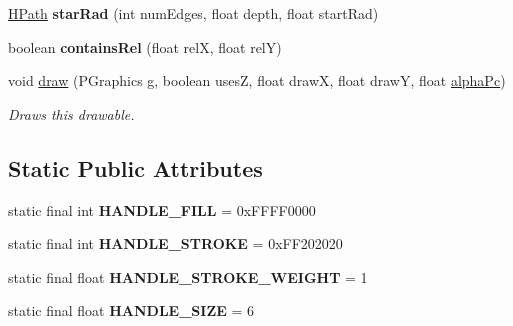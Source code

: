\begin{DoxyCompactItemize}
\item 
\hypertarget{classhype_1_1extended_1_1drawable_1_1_h_path_a31b900ceb515728436ebe504ebbbeda1}{\hyperlink{classhype_1_1extended_1_1drawable_1_1_h_path}{H\-Path} {\bfseries star\-Rad} (int num\-Edges, float depth, float start\-Rad)}\label{classhype_1_1extended_1_1drawable_1_1_h_path_a31b900ceb515728436ebe504ebbbeda1}

\item 
\hypertarget{classhype_1_1extended_1_1drawable_1_1_h_path_ac8f128faad7c12a1a9b0878b9ce503d6}{boolean {\bfseries contains\-Rel} (float rel\-X, float rel\-Y)}\label{classhype_1_1extended_1_1drawable_1_1_h_path_ac8f128faad7c12a1a9b0878b9ce503d6}

\item 
void \hyperlink{classhype_1_1extended_1_1drawable_1_1_h_path_ad373de270293557c0e2ea5eb54903b3e}{draw} (P\-Graphics g, boolean uses\-Z, float draw\-X, float draw\-Y, float \hyperlink{classhype_1_1core_1_1drawable_1_1_h_drawable_ab71ad420ba6d4a5eb981296684033d74}{alpha\-Pc})
\begin{DoxyCompactList}\small\item\em Draws this drawable. \end{DoxyCompactList}\end{DoxyCompactItemize}
\subsection*{Static Public Attributes}
\begin{DoxyCompactItemize}
\item 
\hypertarget{classhype_1_1extended_1_1drawable_1_1_h_path_acc639d9a868f1b2aee55fbedcb05ec71}{static final int {\bfseries H\-A\-N\-D\-L\-E\-\_\-\-F\-I\-L\-L} = 0x\-F\-F\-F\-F0000}\label{classhype_1_1extended_1_1drawable_1_1_h_path_acc639d9a868f1b2aee55fbedcb05ec71}

\item 
\hypertarget{classhype_1_1extended_1_1drawable_1_1_h_path_ac53a76846e735001afe403cacbf1b336}{static final int {\bfseries H\-A\-N\-D\-L\-E\-\_\-\-S\-T\-R\-O\-K\-E} = 0x\-F\-F202020}\label{classhype_1_1extended_1_1drawable_1_1_h_path_ac53a76846e735001afe403cacbf1b336}

\item 
\hypertarget{classhype_1_1extended_1_1drawable_1_1_h_path_a26d814cad78d489ee4f910bbfaa6b673}{static final float {\bfseries H\-A\-N\-D\-L\-E\-\_\-\-S\-T\-R\-O\-K\-E\-\_\-\-W\-E\-I\-G\-H\-T} = 1}\label{classhype_1_1extended_1_1drawable_1_1_h_path_a26d814cad78d489ee4f910bbfaa6b673}

\item 
\hypertarget{classhype_1_1extended_1_1drawable_1_1_h_path_a40108f70fe1b4f70d2bcd98513d55f43}{static final float {\bfseries H\-A\-N\-D\-L\-E\-\_\-\-S\-I\-Z\-E} = 6}\label{classhype_1_1extended_1_1drawable_1_1_h_path_a40108f70fe1b4f70d2bcd98513d55f43}

\end{DoxyCompactItemize}
